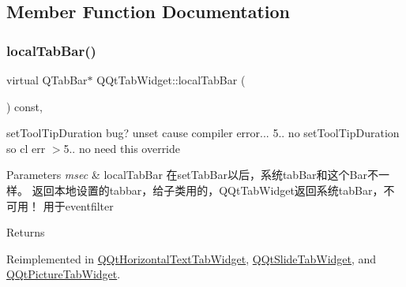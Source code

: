 \subsection{Member Function Documentation}
\mbox{\label{class_q_qt_tab_widget_a53183c40775ba6e7142f429edfd75d9c}} 
\subsubsection{\texorpdfstring{local\+Tab\+Bar()}{localTabBar()}}
{\footnotesize\ttfamily virtual Q\+Tab\+Bar$\ast$ Q\+Qt\+Tab\+Widget\+::local\+Tab\+Bar (\begin{DoxyParamCaption}{ }\end{DoxyParamCaption}) const\hspace{0.3cm}{\ttfamily [inline]}, {\ttfamily [virtual]}}



set\+Tool\+Tip\+Duration bug? unset cause compiler error... 5.. no set\+Tool\+Tip\+Duration so cl err $>$5.. no need this override 


\begin{DoxyParams}{Parameters}
{\em msec} & local\+Tab\+Bar 在set\+Tab\+Bar以后，系统tab\+Bar和这个\+Bar不一样。 返回本地设置的tabbar，给子类用的，\+Q\+Qt\+Tab\+Widget返回系统tab\+Bar，不可用！ 用于eventfilter \\
\hline
\end{DoxyParams}
\begin{DoxyReturn}{Returns}

\end{DoxyReturn}


Reimplemented in \mbox{\hyperlink{class_q_qt_horizontal_text_tab_widget_a212f673045037d360d73d534ebf7ced1}{Q\+Qt\+Horizontal\+Text\+Tab\+Widget}}, \mbox{\hyperlink{class_q_qt_slide_tab_widget_a7e4513d3f457ba2e56a8211ac627a25d}{Q\+Qt\+Slide\+Tab\+Widget}}, and \mbox{\hyperlink{class_q_qt_picture_tab_widget_a75be29bbbc547eae8677eac9de7877b8}{Q\+Qt\+Picture\+Tab\+Widget}}.

\mbox{\label{class_q_qt_tab_widget_a45cec441f1ceb658d628a23c110359f3}} 
